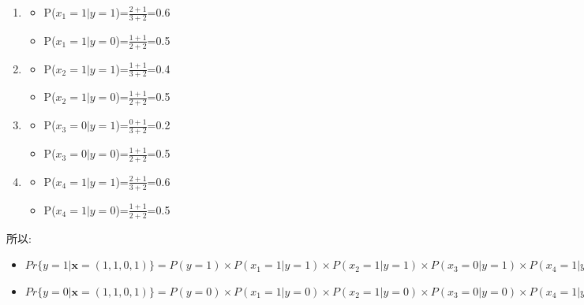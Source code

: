\documentclass[11pt, a4paper, UTF8]{ctexart}
\begin{document}
\begin{solution}
\begin{enumerate}
\begin{enumerate}
\begin{itemize}
	\end{itemize}
	\item \begin{itemize}
		\item P($x_1=1|y=1$)=$\frac{2+1}{3+2}$=0.6
		\item P($x_1=1|y=0$)=$\frac{1+1}{2+2}$=0.5
	\end{itemize}
	\item \begin{itemize}
		\item P($x_2=1|y=1$)=$\frac{1+1}{3+2}$=0.4
		\item P($x_2=1|y=0$)=$\frac{1+1}{2+2}$=0.5
	\end{itemize}
	\item \begin{itemize}
		\item P($x_3=0|y=1$)=$\frac{0+1}{3+2}$=0.2
		\item P($x_3=0|y=0$)=$\frac{1+1}{2+2}$=0.5
	\end{itemize}
	\item \begin{itemize}
		\item P($x_4=1|y=1$)=$\frac{2+1}{3+2}$=0.6
		\item P($x_4=1|y=0$)=$\frac{1+1}{2+2}$=0.5
	\end{itemize}
	\end{enumerate}
		所以:
		\begin{itemize}
	\item $Pr\{ y=1 | \mathbf{x}=(1,1,0,1) \}=P(y=1)\times P(x_1=1|y=1)\times P(x_2=1|y=1)\times P(x_3=0|y=1) \times P(x_4=1|y=1)=0.016457$
	\item $Pr\{ y=0 | \mathbf{x}=(1,1,0,1) \}=P(y=0)\times P(x_1=1|y=0)\times P(x_2=1|y=0)\times P(x_3=0|y=0) \times P(x_4=1|y=0)=0.026785$
		\end{itemize}
\end{enumerate}
    
\end{solution}
\end{document}
